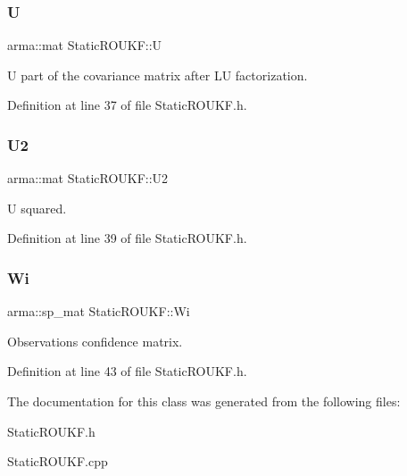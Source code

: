 \subsubsection{\texorpdfstring{U}{U}}
{\footnotesize\ttfamily arma\+::mat Static\+R\+O\+U\+K\+F\+::U\hspace{0.3cm}{\ttfamily [private]}}

U part of the covariance matrix after LU factorization. 

Definition at line 37 of file Static\+R\+O\+U\+K\+F.\+h.

\mbox{\label{classStaticROUKF_a7d4e7278e9aed5a551905ce4109da072}} 
\subsubsection{\texorpdfstring{U2}{U2}}
{\footnotesize\ttfamily arma\+::mat Static\+R\+O\+U\+K\+F\+::\+U2\hspace{0.3cm}{\ttfamily [private]}}

U squared. 

Definition at line 39 of file Static\+R\+O\+U\+K\+F.\+h.

\mbox{\label{classStaticROUKF_a612d1fae1853a0dba561a2557bb6d844}} 
\subsubsection{\texorpdfstring{Wi}{Wi}}
{\footnotesize\ttfamily arma\+::sp\+\_\+mat Static\+R\+O\+U\+K\+F\+::\+Wi\hspace{0.3cm}{\ttfamily [private]}}

Observations confidence matrix. 

Definition at line 43 of file Static\+R\+O\+U\+K\+F.\+h.



The documentation for this class was generated from the following files\+:\begin{DoxyCompactItemize}
\item 
Static\+R\+O\+U\+K\+F.\+h\item 
Static\+R\+O\+U\+K\+F.\+cpp\end{DoxyCompactItemize}
